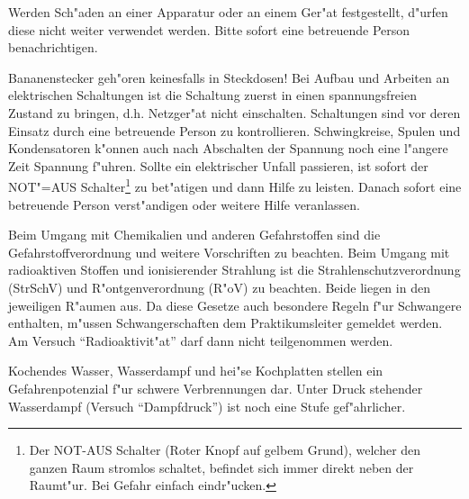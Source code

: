 Werden Sch"aden an einer Apparatur oder an einem Ger"at
festgestellt, d"urfen diese nicht weiter verwendet werden. Bitte
sofort eine betreuende Person benachrichtigen.

Bananenstecker geh"oren keinesfalls in Steckdosen! Bei Aufbau und
Arbeiten an elektrischen Schaltungen ist die Schaltung zuerst in
einen spannungsfreien Zustand zu bringen, d.h. Netzger"at nicht einschalten. Schaltungen sind vor deren
Einsatz durch eine betreuende Person zu kontrollieren.
Schwingkreise, Spulen und Kondensatoren k"onnen auch nach Abschalten
der Spannung noch eine l"angere Zeit Spannung f"uhren. Sollte ein
elektrischer Unfall passieren, ist sofort der NOT"=AUS
Schalter\footnote{Der NOT-AUS Schalter (Roter Knopf auf gelbem
Grund), welcher den ganzen Raum stromlos schaltet, befindet sich
immer direkt neben der Raumt"ur. Bei Gefahr einfach eindr"ucken.} zu
bet"atigen und dann Hilfe zu leisten. Danach sofort eine betreuende
Person verst"andigen oder weitere Hilfe veranlassen.

Beim Umgang mit Chemikalien und anderen
Gefahrstoffen sind die
Gefahrstoffverordnung und weitere Vorschriften zu beachten. Beim
Umgang mit radioaktiven Stoffen und ionisierender Strahlung ist die
Strahlenschutzverordnung
(StrSchV) und R"ontgenverordnung (R"oV)
zu beachten. Beide liegen in den jeweiligen R"aumen aus. Da diese
Gesetze auch besondere Regeln f"ur Schwangere enthalten, m"ussen
Schwangerschaften dem Praktikumsleiter gemeldet werden. Am Versuch
"`Radioaktivit"at"' darf dann nicht teilgenommen werden.


Kochendes Wasser, Wasserdampf und hei"se Kochplatten stellen ein
Gefahrenpotenzial f"ur schwere Verbrennungen dar. Unter Druck
stehender Wasserdampf (Versuch "`Dampfdruck"') ist noch eine Stufe
gef"ahrlicher.


